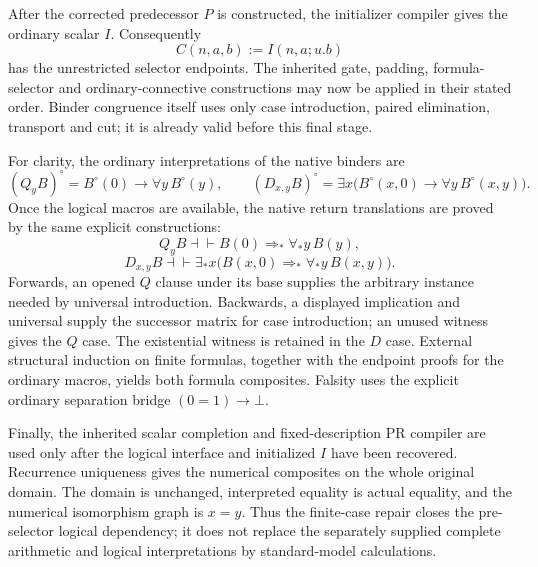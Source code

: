 After the corrected predecessor $P$ is constructed, the initializer
compiler gives the ordinary scalar $I$.  Consequently
\[
 C(n,a,b):=I(n,a;u.b)
\]
has the unrestricted selector endpoints.  The inherited gate, padding,
formula-selector and ordinary-connective constructions may now be applied
in their stated order.  Binder congruence itself uses only case
introduction, paired elimination, transport and cut; it is already valid
before this final stage.

For clarity, the ordinary interpretations of the native binders are
\[
 (Q_yB)^\circ=B^\circ(0)\to\forall y\,B^\circ(y),\qquad
 (D_{x,y}B)^\circ=
 \exists x\bigl(B^\circ(x,0)\to\forall y\,B^\circ(x,y)\bigr).
\]
Once the logical macros are available, the native return translations
are proved by the same explicit constructions:
\[
 Q_yB\dashv\vdash B(0)\Rightarrow_*\forall_*y\,B(y),
\]
\[
 D_{x,y}B\dashv\vdash
 \exists_*x\bigl(B(x,0)\Rightarrow_*\forall_*y\,B(x,y)\bigr).
\]
Forwards, an opened $Q$ clause under its base supplies the arbitrary
instance needed by universal introduction.  Backwards, a displayed
implication and universal supply the successor matrix for case
introduction; an unused witness gives the $Q$ case.  The existential
witness is retained in the $D$ case.  External structural induction on
finite formulas, together with the endpoint proofs for the ordinary
macros, yields both formula composites.  Falsity uses the explicit
ordinary separation bridge $(0=1)\to\bot$.

Finally, the inherited scalar completion and fixed-description PR
compiler are used only after the logical interface and initialized $I$
have been recovered.  Recurrence uniqueness gives the numerical
composites on the whole original domain.  The domain is unchanged,
interpreted equality is actual equality, and the numerical isomorphism
graph is $x=y$.  Thus the finite-case repair closes the pre-selector
logical dependency; it does not replace the separately supplied complete
arithmetic and logical interpretations by standard-model calculations.
